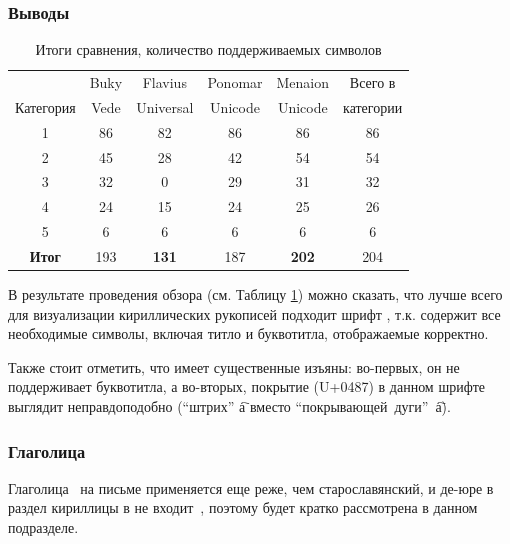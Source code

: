    \subsubsection{Выводы}
        \begin{table}[H]
            \caption{Итоги сравнения, количество поддерживаемых символов}
            \label{tab:results}
            \centering
            \begin{tabular}{|c|c|c|c|c|c|}
                \hline
                & Buky & Flavius & Ponomar & Menaion & Всего в\\
                Категория & Vede & Universal & Unicode & Unicode & категории \\
                \hline
                1 & 86 & 82 & 86 & 86 & 86\\
                \hline
                2 & 45 & 28 & 42 & 54 & 54\\
                \hline
                3 & 32 & 0  & 29 & 31 & 32\\
                \hline
                4 & 24 & 15 & 24 & 25 & 26\\
                \hline
                5 & 6  & 6  & 6  & 6  & 6\\
                \hline
                \textbf{Итог} & 193 & \textbf{131} & 187 & \textbf{202} & 204\\
                \hline
            \end{tabular}
        \end{table}


        В результате проведения обзора (см. Таблицу \ref{tab:results}) можно сказать, что лучше всего для визуализации кириллических рукописей подходит шрифт \menaionunicodefont{}, т.к. содержит все необходимые символы, включая титло и буквотитла, отображаемые корректно.

        Также стоит отметить, что \flavuniversalfont{} имеет существенные изъяны: во-первых, он не поддерживает буквотитла, а во-вторых, покрытие (U+0487) в данном шрифте выглядит неправдоподобно (\enquote{штрих} {\flaviusuniversal а҇} вместо \mbox{\enquote{покрывающей дуги} {\menaionunicode а҇}).}

    \subsubsection{Глаголица}
        Глаголица~\cite{glagoliticArticle} на письме применяется еще реже, чем старославянский, и де-юре в раздел кириллицы в \unicode{} не входит~\cite{unicodeStandardGlagolitic}, поэтому будет кратко рассмотрена в данном подразделе.

